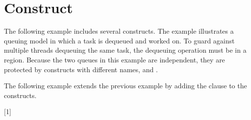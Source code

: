 \pagebreak
\section{ Construct}
\label{sec:critical}

The following example includes several  constructs. The example 
illustrates a queuing model in which a task is dequeued and worked on. To guard 
against multiple threads dequeuing the same task, the dequeuing operation must 
be in a  region. Because the two queues in this example are independent, 
they are protected by  constructs with different names,  
and .



The following example extends the previous example by adding the  clause to the  constructs.


[1]
